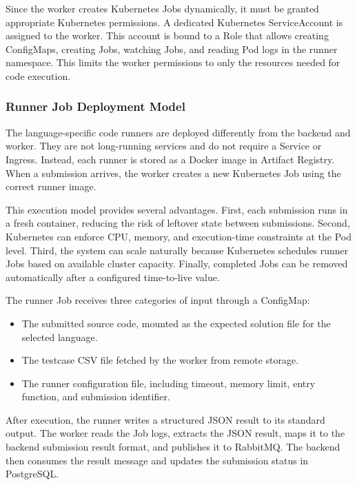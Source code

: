 Since the worker creates Kubernetes Jobs dynamically, it must be granted appropriate Kubernetes permissions. A dedicated Kubernetes ServiceAccount is assigned to the worker. This account is bound to a Role that allows creating ConfigMaps, creating Jobs, watching Jobs, and reading Pod logs in the runner namespace. This limits the worker permissions to only the resources needed for code execution.

\subsubsection{Runner Job Deployment Model}

The language-specific code runners are deployed differently from the backend and worker. They are not long-running services and do not require a Service or Ingress. Instead, each runner is stored as a Docker image in Artifact Registry. When a submission arrives, the worker creates a new Kubernetes Job using the correct runner image.

This execution model provides several advantages. First, each submission runs in a fresh container, reducing the risk of leftover state between submissions. Second, Kubernetes can enforce CPU, memory, and execution-time constraints at the Pod level. Third, the system can scale naturally because Kubernetes schedules runner Jobs based on available cluster capacity. Finally, completed Jobs can be removed automatically after a configured time-to-live value.

The runner Job receives three categories of input through a ConfigMap:

\begin{itemize}
    \item The submitted source code, mounted as the expected solution file for the selected language.
    \item The testcase CSV file fetched by the worker from remote storage.
    \item The runner configuration file, including timeout, memory limit, entry function, and submission identifier.
\end{itemize}

After execution, the runner writes a structured JSON result to its standard output. The worker reads the Job logs, extracts the JSON result, maps it to the backend submission result format, and publishes it to RabbitMQ. The backend then consumes the result message and updates the submission status in PostgreSQL.